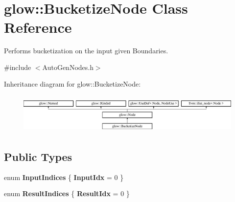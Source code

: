 \hypertarget{classglow_1_1_bucketize_node}{}\section{glow\+:\+:Bucketize\+Node Class Reference}
\label{classglow_1_1_bucketize_node}


Performs bucketization on the input given Boundaries.  




{\ttfamily \#include $<$Auto\+Gen\+Nodes.\+h$>$}

Inheritance diagram for glow\+:\+:Bucketize\+Node\+:\begin{figure}[H]
\begin{center}
\leavevmode
\includegraphics[height=2.028986cm]{classglow_1_1_bucketize_node}
\end{center}
\end{figure}
\subsection*{Public Types}
\begin{DoxyCompactItemize}
\item 
\mbox{\label{classglow_1_1_bucketize_node_aefd6ea8884986478173d180e4c981de9}} 
enum {\bfseries Input\+Indices} \{ {\bfseries Input\+Idx} = 0
 \}
\item 
\mbox{\label{classglow_1_1_bucketize_node_ab34440cfbba43d0daf0a796140ee49fc}} 
enum {\bfseries Result\+Indices} \{ {\bfseries Result\+Idx} = 0
 \}
\end{DoxyCompactItemize}
